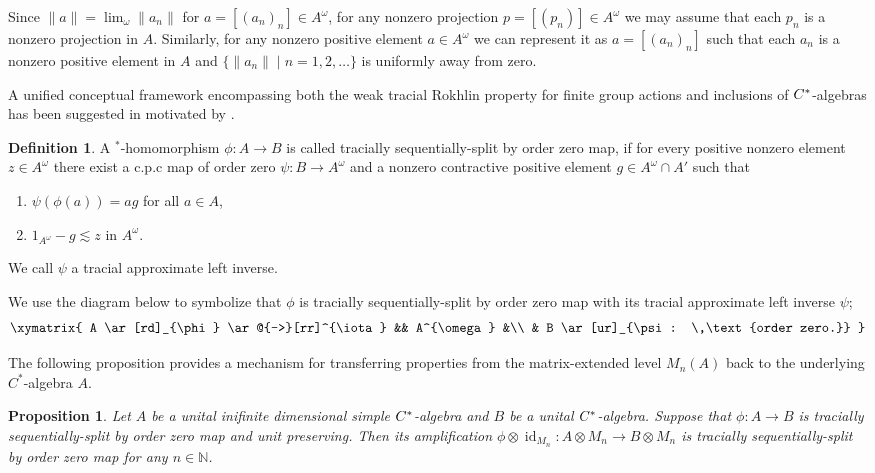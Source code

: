 \documentclass[12pt]{amsart}
\theoremstyle{plain}
\newtheorem{prop}[thm]{Proposition}
\theoremstyle{definition}
\newtheorem{defn}[thm]{Definition}
\def\id{\operatorname{id}}
\numberwithin{equation}{section}
\begin{document}
Since $ \|a\|=\lim_{\omega}\|a_n\|$ for $a=[(a_n)_n] \in A^{\omega}$, for any nonzero projection $p=[(p_n)] \in A^{\omega}$ we may assume that each $p_n$ is a nonzero projection in $A$. Similarly, for any nonzero positive element $a \in A^{\omega}$ we can represent it as $a=[(a_n)_n]$ such that each $a_n$ is a nonzero positive element in $A$ and  $\{ \|a_n\| \mid n=1,2, \dots \}$ is uniformly away from zero.

A unified conceptual framework encompassing both the weak tracial Rokhlin property for finite group actions and inclusions of $C\sp*$-algebras  has been suggested in \cite{LO1} motivated by \cite{BS, LO}. 
\begin{defn} \cite[Definition 3.1]{LO1}\label{D:sequentiallysplitbyorderzero}
 A $^*$-homomorphism $\phi:A \to B$ is called tracially sequentially-split by order zero map, if for every positive nonzero element $z \in A^{\omega}$  there exist a c.p.c map of order zero  $\psi: B \to A^{\omega}$ and a nonzero contractive positive element $g\in A^{\omega}\cap A'$ such that 
\begin{enumerate}
\item $\psi(\phi(a))=ag$ for all $a\in A$, 
\item $1_{A^{\omega}} -g \lesssim z$ in $A^{\omega}$.
\end{enumerate}
We call $\psi$ a tracial approximate left inverse.  
\end{defn}

 We use the diagram below  to symbolize that $\phi$ is tracially sequentially-split by order zero map with its tracial approximate left inverse $\psi$;
\begin{equation*}\label{D:diagram}
\xymatrix{ A \ar[rd]_{\phi} \ar@{-->}[rr]^{\iota} && A^{\omega} &\\
                          & B \ar[ur]_{\psi: \,\text{order zero.}} }
\end{equation*}

The following proposition provides a mechanism for transferring properties from the matrix-extended level $M_n(A)$ back to the underlying $C^*$-algebra $A$. 
\begin{prop}\cite[Proposition 3.3]{LO1}\label{P:amplification}
 Let $A$ be a unital inifinite dimensional simple  $C\sp*$-algebra and $B$ be a unital $C\sp*$-algebra. Suppose that $\phi:A \to B$ is tracially sequentially-split by order zero map and unit preserving. Then its amplification $\phi\otimes \id_{M_n}: A\otimes M_n \to B\otimes M_n$ is tracially sequentially-split by order zero map for any $n\in \mathbb{N}$.  
\end{prop}
\end{document}

